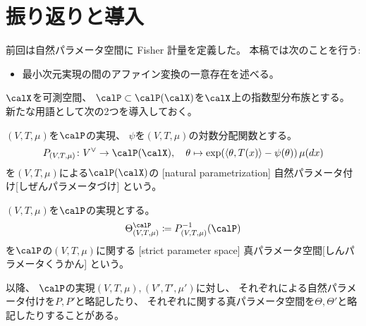 \documentclass[report]{jlreq}
\begin{document}
%

%
\section*{振り返りと導入}

前回は自然パラメータ空間に Fisher 計量を定義した。
本稿では次のことを行う:
\begin{itemize}
    \item 最小次元実現の間のアファイン変換の一意存在を述べる。
\end{itemize}

$\calX$を可測空間、
$\calP \subset \calP(\calX)$を$\calX$上の指数型分布族とする。
新たな用語として次の2つを導入しておく。

\begin{definition}[自然パラメータ付け]
    $(V, T, \mu)$を$\calP$の実現、
    $\psi$を$(V, T, \mu)$の対数分配関数とする。
    \begin{equation}
        P_{(V, T, \mu)} \colon V^\vee \to \calP(\calX),
            \quad
            \theta
            \mapsto
            \exp (\myangle{\theta}{T(x)} - \psi(\theta)) \, \mu(dx)
    \end{equation}
    を$(V, T, \mu)$による$\calP(\calX)$の
    [natural parametrization]
        {自然パラメータ付け}[しぜんパラメータづけ]
    という。
\end{definition}

\begin{definition}[真パラメータ空間]
    $(V, T, \mu)$を$\calP$の実現とする。
    \begin{equation}
        \Theta^\calP_{(V, T, \mu)}
            \coloneqq P_{(V, T, \mu)}^{-1}(\calP)
    \end{equation}
    を$\calP$の$(V, T, \mu)$に関する
    [strict parameter space]
        {真パラメータ空間}[しんパラメータくうかん]
    という。
\end{definition}

以降、
$\calP$の実現$(V, T, \mu), (V', T', \mu')$に対し、
それぞれによる自然パラメータ付けを$P, P'$と略記したり、
それぞれに関する真パラメータ空間を$\Theta, \Theta'$と略記したりすることがある。

%
\end{document}
